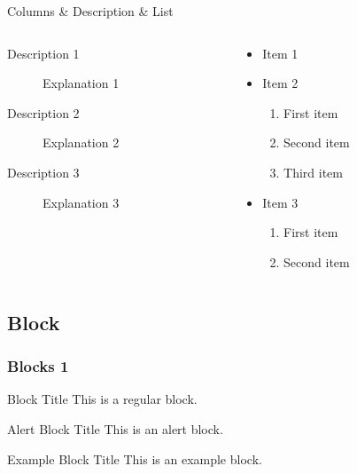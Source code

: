 \documentclass[compress,aspectratio=43]{beamer}
\begin{document}
\begin{frame}{Columns \& Description \& List}

    \begin{columns}

        \begin{column}{0.49\textwidth}
            \begin{description}
                \item[Description 1] Explanation 1
                \item[Description 2] Explanation 2
                \item[Description 3] Explanation 3
            \end{description}
        \end{column}

        \hfill

        \begin{column}{0.49\textwidth}
            \begin{itemize}
                \item Item 1
                \item Item 2
                      \begin{enumerate}
                          \item First item
                          \item Second item
                          \item Third item
                      \end{enumerate}
                \item Item 3
                      \begin{enumerate}
                          \item First item
                          \item Second item
                      \end{enumerate}
            \end{itemize}
        \end{column}
    \end{columns}

\end{frame}

\subsection{Block}

\begin{frame}
    \frametitle{Blocks 1}
    \begin{block}{Block Title}
        This is a regular block.
    \end{block}

    \begin{alertblock}{Alert Block Title}
        This is an alert block.
    \end{alertblock}

    \begin{exampleblock}{Example Block Title}
        This is an example block.
    \end{exampleblock}
\end{frame}
\end{document}
